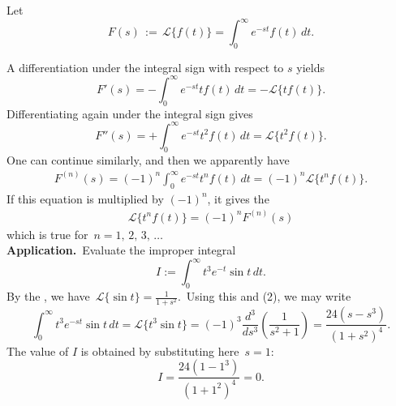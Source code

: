 \documentclass[12pt]{article}
\theoremstyle{definition}
\begin{document}
Let
$$\displaystyle F(s) \,:=\, \mathcal{L}\{f(t)\} = \int_0^\infty e^{-st}f(t)\,dt.$$

A differentiation under the integral sign with respect to $s$ yields
$$F'(s) = -\int_0^\infty e^{-st}tf(t)\,dt = -\mathcal{L}\{tf(t)\}.$$
Differentiating again under the integral sign gives
$$F''(s) = +\int_0^\infty e^{-st}t^2f(t)\,dt = \mathcal{L}\{t^2f(t)\}.$$
One can continue similarly, and then we apparently have
\begin{align}
F^{(n)}(s) = (-1)^n\int_0^\infty e^{-st}t^nf(t)\,dt = (-1)^n\mathcal{L}\{t^nf(t)\}.
\end{align}
If this equation is multiplied by $(-1)^n$, it gives the 
\begin{align}
\mathcal{L}\{t^nf(t)\} = (-1)^nF^{(n)}(s)
\end{align}
which is true for\, $n = 1,\,2,\,3,\,\ldots$\\


\textbf{Application.}\, Evaluate the improper integral
$$I := \int_0^\infty t^3e^{-t}\sin{t}\,dt.$$
By the , we have\, $\mathcal{L}\{\sin{t}\} = \frac{1}{1+s^2}$.\, Using this and (2), we may write
$$\int_0^\infty t^3e^{-st}\sin{t}\,dt = \mathcal{L}\{t^3\sin{t}\} = 
(-1)^3\frac{d^3}{ds^3}\!\left(\frac{1}{s^2+1}\right) = \frac{24(s-s^3)}{(1+s^2)^4}.$$
The value of $I$ is obtained by substituting here\, $s = 1$:
$$I = \frac{24(1-1^3)}{(1+1^2)^4} = 0.$$

\end{document}
